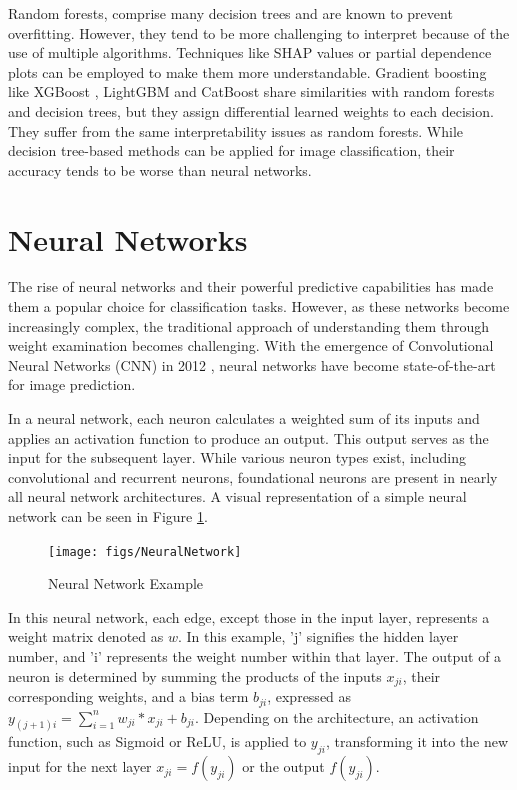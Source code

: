 Random forests\cite{ho1995random}, comprise many decision trees and are known to prevent overfitting. However, they tend to be more challenging to interpret because of the use of multiple algorithms. Techniques like SHAP values \cite{lundberg2017unified} or partial dependence plots \cite{PDP} can be employed to make them more understandable. Gradient boosting like XGBoost \cite{Chen_2016}, LightGBM \cite{Ke2017} and CatBoost \cite{prokhorenkova2019catboost} share similarities with random forests and decision trees, but they assign differential learned weights to each decision. They suffer from the same interpretability issues as random forests. While decision tree-based methods can be applied for image classification, their accuracy tends to be worse than neural networks.


\section{Neural Networks}

The rise of neural networks and their powerful predictive capabilities has made them a popular choice for classification tasks. However, as these networks become increasingly complex, the traditional approach of understanding them through weight examination becomes challenging. With the emergence of Convolutional Neural Networks (CNN) in 2012 \cite{krizhevsky2012nn}, neural networks have become state-of-the-art for image prediction.

In a neural network, each neuron calculates a weighted sum of its inputs and applies an activation function to produce an output. This output serves as the input for the subsequent layer. While various neuron types exist, including convolutional and recurrent neurons, foundational neurons are present in nearly all neural network architectures. A visual representation of a simple neural network can be seen in Figure \ref{fig:Neural_Network}.

\begin{figure}[h!]
	\centering
	\texttt{[image: figs/NeuralNetwork]}
	\caption[Neural Network]{Neural Network Example} 
	\label{fig:Neural_Network}
\end{figure}

In this neural network, each edge, except those in the input layer, represents a weight matrix denoted as $w$. In this example, 'j' signifies the hidden layer number, and 'i' represents the weight number within that layer. The output of a neuron is determined by summing the products of the inputs $x_{ji}$, their corresponding weights, and a bias term $b_{ji}$, expressed as $y_{(j+1)i} = \sum_{i=1}^{n} w_{ji} \ast x_{ji} + b_{ji}$. Depending on the architecture, an activation function, such as Sigmoid or ReLU, is applied to $y_{ji}$, transforming it into the new input for the next layer $x_{ji} = f(y_{ji})$ or the output $f(y_{ji})$. 

